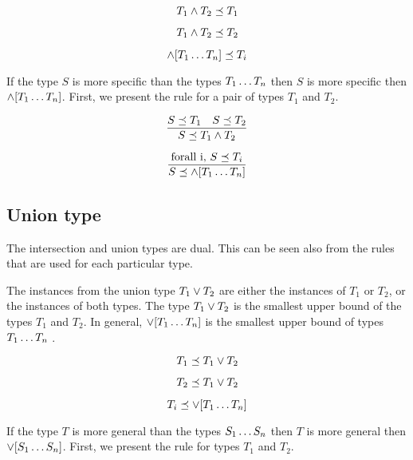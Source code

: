 \documentclass[runningheads]{llncs}
\begin{document}
\begin{equation}
T_1\land\/T_2\preceq\/T_1    
\end{equation}

\begin{equation}
T_1\land\/T_2\preceq\/T_2  
\end{equation}

\begin{equation}
\land[T_1\ldots\/T_n] \preceq\/T_i  
\end{equation}

If the type $S$ is more specific than the types $T_1\ldots\/T_n$ then
$S$ is more specific then $\land[T_1\ldots\/T_n]$. First, we present
the rule for a pair of types $T_1$ and $T_2$.

\begin{equation}
\dfrac{S\preceq\/T_1\quad\/S\preceq\/\/T_2}
      {S\preceq\/T_1\land\/T_2}  
\end{equation}

\begin{equation}
\label{rul:intsc-gather}
\dfrac{\text{forall i,\ } S\preceq\/T_i}
      {S\preceq\land[T_1\ldots\/T_n]}  
\end{equation}

\subsection{Union type}

The intersection and union types are dual. This can be seen also from
the rules that are used for each particular type.

The instances from the union type $T_1\lor\/T_2$ are either the
instances of $T_1$ or $T_2$, or the instances of both types. The type
$T_1\lor\/T_2$ is the smallest upper bound of the types $T_1$ and
$T_2$. In general, $\lor[T_1\ldots\/T_n]$ is the smallest upper bound
of types $T_1\ldots\/T_n$ \cite{Pierce90CalculusIntersectUnion}.

\begin{equation}
T_1\preceq\/T_1\lor\/T_2    
\end{equation}

\begin{equation}
T_2\preceq\/T_1\lor\/T_2  
\end{equation}

\begin{equation}
T_i\preceq\/\lor[T_1\ldots\/T_n]  
\end{equation}

If the type $T$ is more general than the types $S_1\ldots\/S_n$ then
$T$ is more general then $\lor[S_1\ldots\/S_n]$. First, we present
the rule for types $T_1$ and $T_2$.
\end{document}
